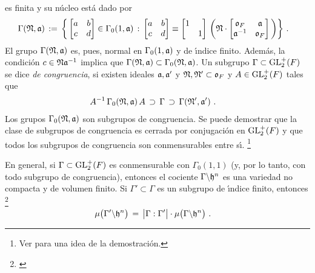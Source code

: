 es finita y su n\'{u}cleo est\'{a} dado por
\begin{align*}
	\Gamma(\frak{N},\frak{a}) & \,:=\,
		\bigg\{\begin{bmatrix} a & b \\ c & d \end{bmatrix}\in
			\Gamma_{0}(1,\frak{a})\,:\,
		\begin{bmatrix} a & b \\ c & d \end{bmatrix}
			\equiv
			\begin{bmatrix} 1 & \\ & 1 \end{bmatrix}\,
				\bigg(\frak{N}\cdot
				\begin{bmatrix} \oka{F} & \frak{a} \\
				\frak{a}^{-1} & \oka{F} \end{bmatrix}
				\bigg)
			\bigg\}%
	\text{ .}
\end{align*}
%
El grupo $\Gamma(\frak{N},\frak{a})$ es, pues, normal en
$\Gamma_{0}(1,\frak{a})$ y de \'{\i}ndice finito. Adem\'{a}s, la
condici\'{o}n $c\in\frak{N}\frak{a}^{-1}$ implica que
$\Gamma(\frak{N},\frak{a})\subset\Gamma_{0}(\frak{N},\frak{a})$. Un subgrupo
$\Gamma\subset\GLtp_{2}(F)$ se dice \emph{de congruencia}, si
existen ideales $\frak{a},\frak{a}'$ y $\frak{N},\frak{N}'\subset\oka{F}$ y
$A\in\GLtp_{2}(F)$ tales que
\begin{align*}
	A^{-1}\,\Gamma_{0}(\frak{N},\frak{a})\,A & \,\supset\,
		\Gamma \,\supset\,
		\Gamma(\frak{N}',\frak{a}')
	\text{ .}
\end{align*}
%
Los grupos $\Gamma_{0}(\frak{N},\frak{a})$ son subgrupos de congruencia. Se
puede demostrar que la clase de subgrupos de congruencia es cerrada por
conjugaci\'{o}n en $\GLtp_{2}(F)$ y que todos los subgrupos de congruencia son
conmensurables entre s\'{\i}.%
\footnote{
	Ver \cite[Ch.~I, \S~3]{FreitagForms} para una idea de la
	demostraci\'{o}n.
}

En general, si $\Gamma\subset\GLtp_{2}(F)$ es conmensurable con
$\Gamma_{0}(1,1)$ (y, por lo tanto, con todo subgrupo de congruencia), entonces
el cociente $\Gamma\backslash\hP^{n}$ es una variedad no compacta y de volumen
finito. Si $\Gamma'\subset\Gamma$ es un subgrupo de \'{\i}ndice finito,
entonces%
\footnote{
	\cite[Ch.~IV,\S~1]{vanDerGeerSurfaces}
}
\begin{align*}
	\mu\big(\Gamma'\backslash\hP^{n}\big) & \,=\,
		\big|\Gamma:\Gamma'\big|\cdot
			\mu\big(\Gamma\backslash\hP^{n}\big)
	\text{ .}
\end{align*}
%

